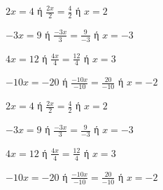 \begin{alist}
\item $ 2x=4 $ ή $ \frac{2x}{2}=\frac{4}{2} $ ή $ x=2 $
\item $ -3x=9 $ ή $ \frac{-3x}{3}=\frac{9}{-3} $ ή $ x=-3 $
\item $ 4x=12 $ ή $ \frac{4x}{4}=\frac{12}{4} $ ή $ x=3 $
\item $ -10x=-20 $ ή $ \frac{-10x}{-10}=\frac{20}{-10} $ ή $ x=-2 $
\end{alist}
\begin{alist}
\item $ 2x=4 $ ή $ \frac{2x}{2}=\frac{4}{2} $ ή $ x=2 $
\item $ -3x=9 $ ή $ \frac{-3x}{3}=\frac{9}{-3} $ ή $ x=-3 $
\item $ 4x=12 $ ή $ \frac{4x}{4}=\frac{12}{4} $ ή $ x=3 $
\item $ -10x=-20 $ ή $ \frac{-10x}{-10}=\frac{20}{-10} $ ή $ x=-2 $
\end{alist}
